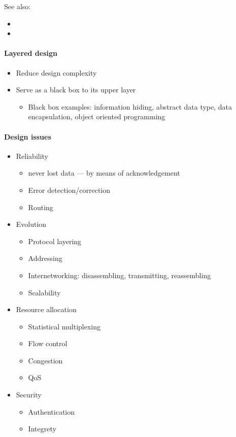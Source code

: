 See also:
\begin{itemize}
\item {}
\item {}
\end{itemize}

\paragraph{Layered design}

\begin{itemize}
\item Reduce design complexity
\item Serve as a black box to its upper layer
  \begin{itemize}
  \item Black box examples: information hiding, abstract data type, data encapsulation,
    object oriented programming
  \end{itemize}
\end{itemize}
  
\paragraph{Design issues}

\begin{multicols}{2}
  \begin{itemize}
  \item Reliability
    \begin{itemize}
    \item never lost data --- by means of acknowledgement
    \item Error detection/correction
    \item Routing
    \end{itemize}
  \item Evolution
    \begin{itemize}
    \item Protocol layering
    \item Addressing
    \item Internetworking: disassembling, transmitting, reassembling
    \item Scalability
    \end{itemize}
  \item Resource allocation
    \begin{itemize}
    \item Statistical multiplexing
    \item Flow control
    \item Congestion
    \item QoS
    \end{itemize}
  \item Security
    \begin{itemize}
    \item Authentication
    \item Integrety
    \end{itemize}
  \end{itemize}
\end{multicols}

